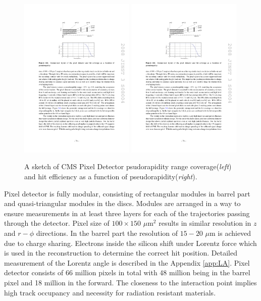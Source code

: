 \begin{figure}[htbp]
	\centering
		\includegraphics[width=0.49\textwidth]{Figures/pixel_eta.pdf}
		\includegraphics[width=0.49\textwidth]{Figures/pixel_eta2.pdf}
	\caption[CMS Pixel Detector psudorapidity range coverage and efficiency]{A sketch of CMS Pixel Detector psudorapidity range coverage(\textit{left}) and hit efficiency as a function of pseudorapidity(\textit{right}). \cite{Chatrchyan:2008aa}}
	\label{fig:pixels_eta}
\end{figure}
\par Pixel detector is fully modular, consisting of rectangular modules in barrel part and quasi-triangular modules in the discs. Modules are arranged in a way to ensure measurements in at least three layers for each of the trajectories passing through the detector. Pixel size of $100\times150$ $\mu$m$^2$ results in similar resolution in $z$ and $r-\phi$ directions. In the barrel part the resolution of $15-20$ $\mu$m is achieved due to  charge sharing. Electrons inside the silicon shift under Lorentz force which is used in the reconstruction to determine the correct hit position. Detailed measurement of the Lorentz angle is described in the Appendix \ref{app:LA}. Pixel detector consists of 66 million pixels in total with 48 million being in the barrel pixel and 18 million in the forward. The closeness to the interaction point implies high track occupancy and necessity for radiation resistant materials. 

